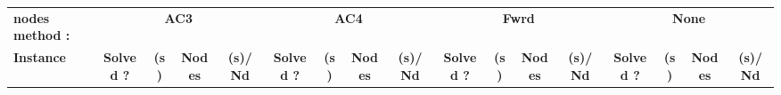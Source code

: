 \documentclass[main.tex]{subfiles}
\begin{document}
\thispagestyle{empty}

\begin{landscape}
\begin{center}
\renewcommand{\arraystretch}{1.4} 
\begin{tabular}{|l|cccc|cccc|cccc|cccc|}
	\hline
\textbf{nodes method :} & \multicolumn{4}{c}{\textbf{AC3}} & \multicolumn{4}{c}{\textbf{AC4}} & \multicolumn{4}{c}{\textbf{Fwrd}} & \multicolumn{4}{c}{\textbf{None}}\\
\textbf{Instance}  & \textbf{Solved ?} & \textbf{(s)} & \textbf{Nodes} & \textbf{(s)/Nd} & \textbf{Solved ?} & \textbf{(s)} & \textbf{Nodes} & \textbf{(s)/Nd} & \textbf{Solved ?} & \textbf{(s)} & \textbf{Nodes} & \textbf{(s)/Nd} & \textbf{Solved ?} & \textbf{(s)} & \textbf{Nodes} & \textbf{(s)/Nd}\\\hline


\end{tabular}
\end{center}
\end{landscape}
\end{document}

